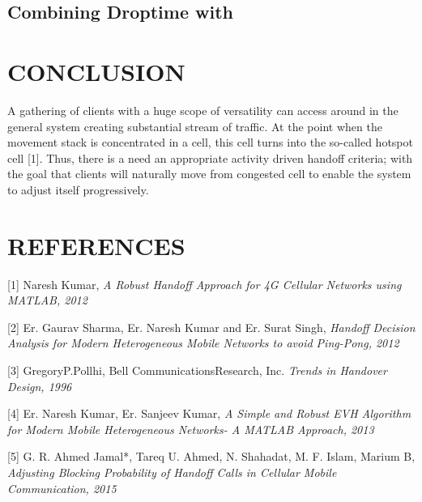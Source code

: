 \documentclass[a4paper]{IEEEtran}
\begin{document}
\subsection{Combining Droptime with }

\section{\textbf{CONCLUSION}}
A gathering of clients with a huge scope of versatility can access around in the general system creating substantial stream of traffic. At the point when the movement stack is concentrated in a cell, this cell turns into the so-called hotspot cell [1]. Thus, there is a need an appropriate activity driven handoff criteria; with the goal that clients will naturally move from congested cell to enable the system to adjust itself progressively.

\section{\textbf{REFERENCES}}

[1] Naresh Kumar, \textit{A Robust Handoff Approach for 4G Cellular Networks using MATLAB, 2012}

[2] Er. Gaurav Sharma, Er. Naresh Kumar and Er. Surat Singh,
\textit{
Handoff Decision Analysis for Modern Heterogeneous Mobile Networks to avoid Ping-Pong, 2012}

[3] GregoryP.Pollhi, Bell CommunicationsResearch, Inc. \textit{Trends in Handover Design, 1996}

[4] Er. Naresh Kumar, Er. Sanjeev Kumar, \textit{A Simple and Robust EVH Algorithm for Modern Mobile Heterogeneous Networks- A MATLAB Approach, 2013}

[5] G. R. Ahmed Jamal*, Tareq U. Ahmed, N. Shahadat, M. F. Islam, Marium B, \textit{Adjusting Blocking Probability of Handoff Calls in Cellular Mobile Communication, 2015}
\end{document}
